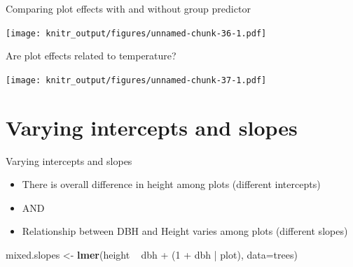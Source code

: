 \documentclass[10pt,ignorenonframetext,]{beamer}
\newenvironment{Shaded}{\begin{snugshade}}{\end{snugshade}}
\newcommand{\KeywordTok}[1]{\textcolor[rgb]{0.13,0.29,0.53}{\textbf{{#1}}}}
\newcommand{\DataTypeTok}[1]{\textcolor[rgb]{0.13,0.29,0.53}{{#1}}}
\newcommand{\DecValTok}[1]{\textcolor[rgb]{0.00,0.00,0.81}{{#1}}}
\newcommand{\StringTok}[1]{\textcolor[rgb]{0.31,0.60,0.02}{{#1}}}
\newcommand{\NormalTok}[1]{{#1}}
\begin{document}
\begin{frame}{Comparing plot effects with and without group predictor}

\texttt{[image: knitr\_output/figures/unnamed-chunk-36-1.pdf]}

\end{frame}

\begin{frame}[fragile]{Are plot effects related to temperature?}

\begin{Shaded}
\end{Shaded}

\texttt{[image: knitr\_output/figures/unnamed-chunk-37-1.pdf]}

\end{frame}

\section{Varying intercepts and
slopes}\label{varying-intercepts-and-slopes}

\begin{frame}[fragile]{Varying intercepts and slopes}

\begin{itemize}[<+->]
\item
  There is overall difference in height among plots (different
  intercepts)
\item
  AND
\item
  Relationship between DBH and Height varies among plots (different
  slopes)
\end{itemize}

\begin{Shaded}
\begin{Highlighting}[]
\NormalTok{mixed.slopes <-}\StringTok{ }\KeywordTok{lmer}\NormalTok{(height ~}\StringTok{ }\NormalTok{dbh +}\StringTok{ }\NormalTok{(}\DecValTok{1} \NormalTok{+}\StringTok{ }\NormalTok{dbh |}\StringTok{ }\NormalTok{plot), }\DataTypeTok{data=}\NormalTok{trees)}
\end{Highlighting}
\end{Shaded}

\end{frame}
\end{document}
